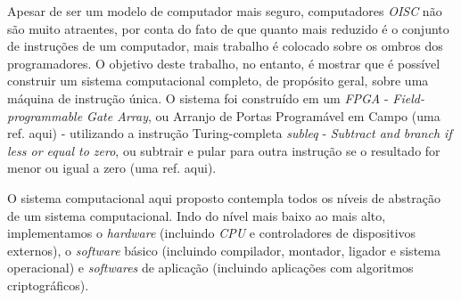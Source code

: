 Apesar de ser um modelo de computador mais seguro, computadores \textit{OISC} não são muito atraentes, por conta do fato de que quanto mais reduzido é o conjunto de instruções de um computador, mais trabalho é colocado sobre os ombros dos programadores. O objetivo deste trabalho, no entanto, é mostrar que é possível construir um sistema computacional completo, de propósito geral, sobre uma máquina de instrução única. O sistema foi construído em um \textit{FPGA} - \textit{Field-programmable Gate Array}, ou Arranjo de Portas Programável em Campo (uma ref. aqui) - utilizando a instrução Turing-completa \textit{subleq} - \textit{Subtract and branch if less or equal to zero}, ou subtrair e pular para outra instrução se o resultado for menor ou igual a zero (uma ref. aqui).

O sistema computacional aqui proposto contempla todos os níveis de abstração de um sistema computacional. Indo do nível mais baixo ao mais alto, implementamos o \textit{hardware} (incluindo \textit{CPU} e controladores de dispositivos externos), o \textit{software} básico (incluindo compilador, montador, ligador e sistema operacional) e \textit{softwares} de aplicação (incluindo aplicações com algoritmos criptográficos).
